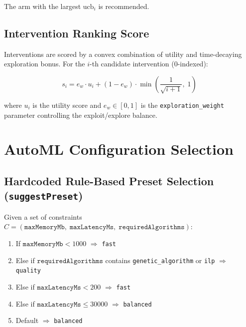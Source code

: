 \documentclass[11pt,a4paper]{article}
\begin{document}
The arm with the largest $\text{ucb}_i$ is recommended.

\subsection{Intervention Ranking Score}

Interventions are scored by a convex combination of utility and time-decaying
exploration bonus. For the $i$-th candidate intervention (0-indexed):

\begin{equation}
  s_i = e_w \cdot u_i + (1 - e_w) \cdot \min\!\left(\frac{1}{\sqrt{i+1}},\;1\right)
\end{equation}

where $u_i$ is the utility score and $e_w \in [0,1]$ is the
\texttt{exploration\_weight} parameter controlling the exploit/explore balance.

\section{AutoML Configuration Selection}

\subsection{Hardcoded Rule-Based Preset Selection (\texttt{suggestPreset})}

Given a set of constraints $C = (\texttt{maxMemoryMb},\;\texttt{maxLatencyMs},\;
\texttt{requiredAlgorithms})$:

\begin{enumerate}
  \item If $\texttt{maxMemoryMb} < 1000$ $\Rightarrow$ \texttt{fast}
  \item Else if $\texttt{requiredAlgorithms}$ contains \texttt{genetic\_algorithm}
        or \texttt{ilp} $\Rightarrow$ \texttt{quality}
  \item Else if $\texttt{maxLatencyMs} < 200$ $\Rightarrow$ \texttt{fast}
  \item Else if $\texttt{maxLatencyMs} \leq 30000$ $\Rightarrow$ \texttt{balanced}
  \item Default $\Rightarrow$ \texttt{balanced}
\end{enumerate}
\end{document}
